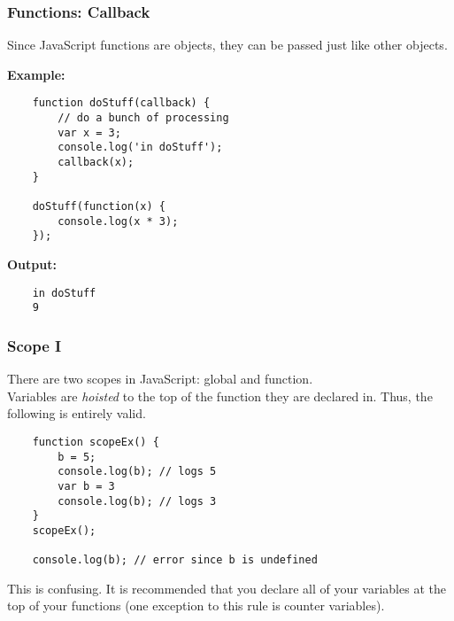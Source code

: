\documentclass{lug}
\begin{document}
\begin{frame}[fragile]
    \frametitle{Functions: Callback}
    Since JavaScript functions are objects, they can be passed just like other objects.

    \textbf{Example:}

    \begin{lstlisting}
    function doStuff(callback) {
        // do a bunch of processing
        var x = 3;
        console.log('in doStuff');
        callback(x);
    }

    doStuff(function(x) {
        console.log(x * 3);
    });
    \end{lstlisting}

    \textbf{Output:}

    \begin{lstlisting}
    in doStuff
    9
    \end{lstlisting}
\end{frame}

\begin{frame}[fragile]
    \frametitle{Scope I}

    There are two scopes in JavaScript: global and function.\footnotemark[1]\\

    Variables are \textit{hoisted} to the top of the function they are declared in. Thus, the
    following is entirely valid.

    \begin{lstlisting}
    function scopeEx() {
        b = 5;
        console.log(b); // logs 5
        var b = 3
        console.log(b); // logs 3
    }
    scopeEx();

    console.log(b); // error since b is undefined
    \end{lstlisting}

    This is confusing. It is recommended that you declare all of your variables at the top of your
    functions (one exception to this rule is counter variables).

\end{frame}
\end{document}
